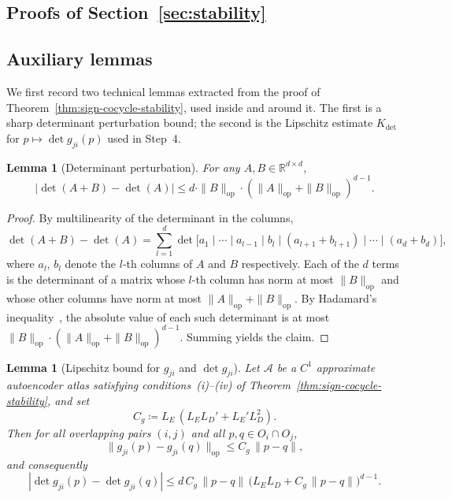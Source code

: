 \documentclass[11pt]{article}
\newcommand{\R}{\mathbb{R}}
\theoremstyle{plain}
\newtheorem{lemma}[theorem]{Lemma}
\theoremstyle{definition}
\theoremstyle{remark}
\begin{document}
\begin{appendices}
\section{Proofs of Section~\ref{sec:stability}}\label{app:proofs}

\subsection{Auxiliary lemmas}

We first record two technical lemmas extracted from the proof of Theorem~\ref{thm:sign-cocycle-stability}, used inside and around it. The first is a sharp determinant perturbation bound; the second is the Lipschitz estimate $K_{\det}$ for $p \mapsto \det g_{ji}(p)$ used in Step~4.

\begin{lemma}[Determinant perturbation]\label{lem:det-perturbation}
For any $A, B \in \R^{d \times d}$,
\[
|\det(A + B) - \det(A)| \leq d \cdot \|B\|_{\mathrm{op}} \cdot (\|A\|_{\mathrm{op}} + \|B\|_{\mathrm{op}})^{d-1}.
\]
\end{lemma}

\begin{proof}
By multilinearity of the determinant in the columns,
\[
\det(A + B) - \det(A) = \sum_{l=1}^{d} \det\bigl[a_1 \mid \cdots \mid a_{l-1} \mid b_l \mid (a_{l+1} + b_{l+1}) \mid \cdots \mid (a_d + b_d)\bigr],
\]
where $a_l$, $b_l$ denote the $l$-th columns of $A$ and $B$ respectively. Each of the $d$ terms is the determinant of a matrix whose $l$-th column has norm at most $\|B\|_{\mathrm{op}}$ and whose other columns have norm at most $\|A\|_{\mathrm{op}} + \|B\|_{\mathrm{op}}$. By Hadamard's inequality~\cite[Theorem~3.3.16]{horn2012matrix}, the absolute value of each such determinant is at most $\|B\|_{\mathrm{op}} \cdot (\|A\|_{\mathrm{op}} + \|B\|_{\mathrm{op}})^{d-1}$. Summing yields the claim.
\end{proof}

\begin{lemma}[Lipschitz bound for $g_{ji}$ and $\det g_{ji}$]\label{lem:Ldet}
Let $\mathcal{A}$ be a $C^1$ approximate autoencoder atlas satisfying conditions~(i)--(iv) of Theorem~\ref{thm:sign-cocycle-stability}, and set
\[
C_g \coloneqq L_E\,(L_E L_D' + L_E' L_D^2).
\]
Then for all overlapping pairs $(i, j)$ and all $p, q \in O_i \cap O_j$,
\[
\|g_{ji}(p) - g_{ji}(q)\|_{\mathrm{op}} \leq C_g\,\|p - q\|,
\]
and consequently
\[
|\det g_{ji}(p) - \det g_{ji}(q)| \leq d\,C_g\,\|p - q\|\,\bigl(L_E L_D + C_g\,\|p - q\|\bigr)^{d-1}.
\]
\end{lemma}


\end{appendices}
\end{document}
